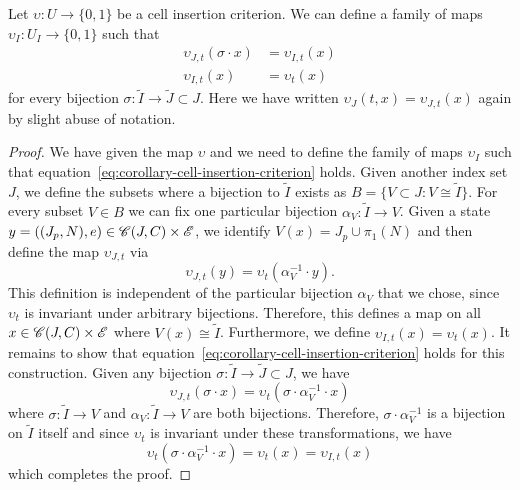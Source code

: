 \begin{lemma}
    Let $\upsilon:U\rightarrow\{0,1\}$ be a cell insertion criterion.
    We can define a family of maps $\upsilon_I:U_I\rightarrow\{0,1\}$ such that
    \begin{align}
        \upsilon_{J,t}(\sigma\cdot x) &= \upsilon_{I,t}(x)
        \label{eq:corollary-cell-insertion-criterion}\\
        \upsilon_{I,t}(x) &= \upsilon_t(x)
    \end{align}
    for every bijection $\sigma:\tilde{I}\rightarrow\tilde{J}\subset J$.
    Here we have written $\upsilon_J(t,x)=\upsilon_{J,t}(x)$ again by slight abuse of notation.
\end{lemma}
\begin{proof}
    We have given the map $\upsilon$ and we need to define the family of maps $\upsilon_I$ such that
    equation~\eqref{eq:corollary-cell-insertion-criterion} holds.
    Given another index set $J$, we define the subsets where a bijection to $\tilde{I}$ exists as
    $B=\{V\subset J:V\cong\tilde{I}\}$.
    For every subset $V\in B$ we can fix one particular bijection $\alpha_V:\tilde{I}\rightarrow V$.
    Given a state $y=((J_p,N),e)\in\mathscr{C}(J,C)\times\mathscr{E}$, we identify $V(x)=J_p\cup\pi_1(N)$ and then
    define the map $\upsilon_{J,t}$ via
    \begin{equation}
        \upsilon_{J,t}(y) = \upsilon_t(\alpha^{-1}_V\cdot y).
    \end{equation}
    This definition is independent of the particular bijection $\alpha_V$ that we chose, since
    $\upsilon_t$ is invariant under arbitrary bijections.
    Therefore, this defines a map on all $x\in\mathscr{C}(J,C)\times\mathscr{E}$ where $V(x)\cong\tilde{I}$.
    Furthermore, we define $\upsilon_{I,t}(x)=\upsilon_t(x)$.
    It remains to show that equation~\eqref{eq:corollary-cell-insertion-criterion} holds for this
    construction.
    Given any bijection $\sigma:\tilde{I}\rightarrow\tilde{J}\subset J$, we have
    \begin{equation}
        \upsilon_{J,t}(\sigma\cdot x) = \upsilon_t(\sigma\cdot\alpha_V^{-1}\cdot x)
    \end{equation}
    where $\sigma:\tilde{I}\rightarrow V$ and $\alpha_V:\tilde{I}\rightarrow V$ are both bijections.
    Therefore, $\sigma\cdot\alpha^{-1}_V$ is a bijection on $\tilde{I}$ itself and since
    $\upsilon_t$ is invariant under these transformations, we have
    \begin{equation}
        \upsilon_t(\sigma\cdot\alpha_V^{-1}\cdot x) = \upsilon_t(x) = \upsilon_{I,t}(x)
    \end{equation}
    which completes the proof.
\end{proof}

